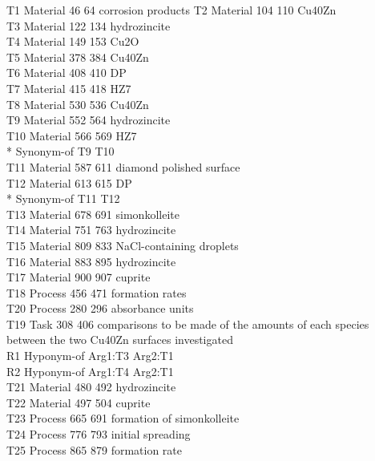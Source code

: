 \begin{appendices}
\noindent T1	Material 46 64	corrosion products
T2	Material 104 110	Cu40Zn\\
T3	Material 122 134	hydrozincite\\
T4	Material 149 153	Cu2O\\
T5	Material 378 384	Cu40Zn\\
T6	Material 408 410	DP\\
T7	Material 415 418	HZ7\\
T8	Material 530 536	Cu40Zn\\
T9	Material 552 564	hydrozincite\\
T10	Material 566 569	HZ7\\
*	Synonym-of T9 T10\\
T11	Material 587 611	diamond polished surface\\
T12	Material 613 615	DP\\
*	Synonym-of T11 T12\\
T13	Material 678 691	simonkolleite\\
T14	Material 751 763	hydrozincite\\
T15	Material 809 833	NaCl-containing droplets\\
T16	Material 883 895	hydrozincite\\
T17	Material 900 907	cuprite\\
T18	Process 456 471	formation rates\\
T20	Process 280 296	absorbance units\\
T19	Task 308 406	comparisons to be made of the amounts of each species between the two Cu40Zn surfaces investigated\\
R1	Hyponym-of Arg1:T3 Arg2:T1\\
R2	Hyponym-of Arg1:T4 Arg2:T1\\
T21	Material 480 492	hydrozincite\\
T22	Material 497 504	cuprite\\
T23	Process 665 691	formation of simonkolleite\\
T24	Process 776 793	initial spreading\\
T25	Process 865 879	formation rate\\


\end{appendices}
